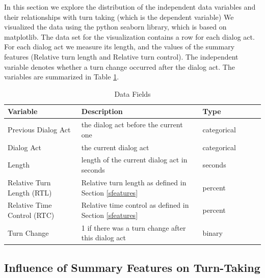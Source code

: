 In this section we explore the distribution of the independent data variables and their relationships with turn taking (which is the dependent variable)
%
We visualized the data using the python seaborn library, which is based on matplotlib. The data set for the visualization contains a row for each dialog act. For each dialog act we measure its length, and the values of the summary features (Relative turn length and Relative turn control). The independent variable denotes whether a turn change occurred after the dialog act.  The variables are summarized in Table \ref {tab:vars}.

\begin{table}[ht!]
\begin{center}
\begin{tabular}{llllrr}
\toprule
Variable &  Description & Type &\\
\midrule
     Previous Dialog Act & the dialog act before the current one  & categorical\\
     Dialog Act & the current dialog act & categorical \\
     Length & length of the current dialog act in seconds & seconds \\
     Relative Turn Length (RTL)  & Relative turn length as defined in Section \ref{sfeatures} & percent \\
     Relative Time Control (RTC) & Relative time control as defined in Section \ref{sfeatures} & percent \\
     Turn Change & 1 if there was a turn change after this dialog act & binary \\
\bottomrule
\end{tabular}
\end{center}
\caption{Data Fields}
\label{tab:vars}
\end{table}


\subsection{Influence of Summary Features on Turn-Taking}
\label{sec:data:summary}

